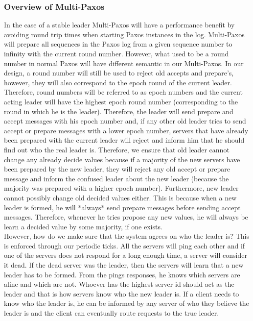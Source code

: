 \documentclass[a4paper]{article}
\begin{document}
\subsubsection{Overview of Multi-Paxos}

In the case of a stable leader Multi-Paxos will have a performance benefit by avoiding round trip times when starting Paxos instances in the log.
Multi-Paxos will prepare all sequences in the Paxos log from a given sequence number to infinity with the current round number.
However, what used to be a round number in normal Paxos will have different semantic in our Multi-Paxos.
In our design, a round number will still be used to reject old accepts and prepare's, however, they will also correspond to the epoch round of the current leader. 
Therefore, round numbers will be referred to as epoch numbers and the current acting leader will have the highest epoch round number (corresponding to the round in which he is the leader).
Therefore, the leader will send prepare and accept messages with his epoch number and, if any other old leader tries to send accept or prepare messages with a lower epoch number, servers that have already been prepared with the current leader will reject and inform him that he should find out who the real leader is.
Therefore, we ensure that old leader cannot change any already decide values because if a majority of the new servers have been prepared by the new leader, they will reject any old accept or prepare message and inform the confused leader about the new leader (because the majority was prepared with a higher epoch number).
Furthermore, new leader cannot possibly change old decided values either. 
This is because when a new leader is formed, he will *always* send prepare messages before sending accept messages.
Therefore, whenever he tries propose any new values, he will always be learn a decided value by some majority, if one exists.
\\
\indent However, how do we make sure that the system agrees on who the leader is? 
This is enforced through our periodic ticks.
All the servers will ping each other and if one of the servers does not respond for a long enough time, a server will consider it dead.
If the dead server was the leader, then the servers will learn that a new leader has to be formed.
From the pings responses, he knows which  servers are aline and which are not.
Whoever has the highest server id should act as the leader and that is how servers know who the new leader is.
If a client needs to know who the leader is, he can be informed by any server of who they believe the leader is and the client can eventually route requests to the true leader.
\end{document}

